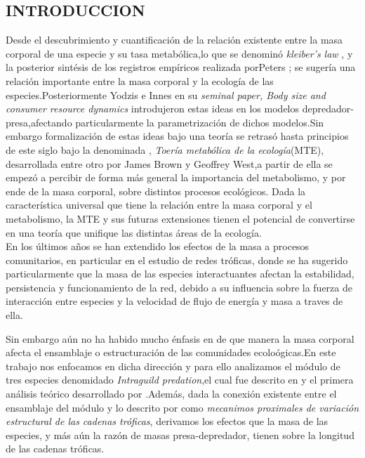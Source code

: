 \subsection{INTRODUCCION}

Desde el descubrimiento y cuantificaci\'on de la relaci\'on existente entre la masa corporal de una especie y su tasa metab\'olica,lo que se denomin\'o \emph{kleiber's law} \citep{kleiber1961fire}, y la posterior sint\'esis de los registros emp\'iricos realizada porPeters \citep{peters1986ecological}; se suger\'ia una relaci\'on importante entre la masa corporal y la ecolog\'ia de las especies.Posteriormente Yodzis e Innes en su \emph{seminal paper, Body size and consumer resource dynamics}\citep{yodzis1992body} introdujeron estas ideas en los modelos depredador-presa,afectando particularmente la parametrizaci\'on de dichos modelos.Sin embargo formalizaci\'on de estas ideas bajo una teor\'ia se retras\'o hasta principios de este siglo bajo la denominada , \emph{Toer\'ia metab\'olica de la ecolog\'ia}(MTE), desarrollada entre otro por James Brown y Geoffrey West\citep{brown2004toward},a partir de ella se empez\'o a percibir de forma m\'as general la importancia del metabolismo, y por ende de la masa corporal, sobre distintos procesos ecol\'ogicos. Dada la caracter\'istica universal que tiene la relaci\'on entre la masa corporal y el metabolismo, la MTE y sus futuras extensiones tienen el potencial de convertirse en una teor\'ia que unifique las distintas \'areas de la ecolog\'ia.\\
En los \'ultimos a\~nos se han extendido los efectos de la masa a procesos comunitarios, en particular en el estudio de redes tr\'oficas, donde se ha sugerido particularmente que la masa de las especies interactuantes afectan la estabilidad, persistencia y funcionamiento de la red, debido a su influencia sobre la fuerza de interacci\'on entre especies y la velocidad de flujo de energ\'ia y masa a traves de ella. \citep{varios, citar luego}

Sin embargo a\'un no ha habido mucho \'enfasis en de que manera la masa corporal afecta el ensamblaje o estructuraci\'on de las comunidades ecolo\'ogicas.En este trabajo nos enfocamos en dicha direcci\'on y para ello analizamos el m\'odulo de tres especies denomidado \emph{Intraguild predation},el cual fue descrito en \cite{polis1989ecology} y el primera an\'alisis te\'orico desarrollado por \cite{holt1997theoretical}.Adem\'as, dada la conexi\'on existente entre el ensamblaje del m\'odulo y lo descrito por \cite{TP2007proximate} como \emph{mecanimos proximales de variaci\'on estructural de las cadenas tr\'oficas}, derivamos los efectos que la masa de las especies, y m\'as a\'un la raz\'on de masas presa-depredador, tienen sobre la longitud de las cadenas tr\'oficas. \\

